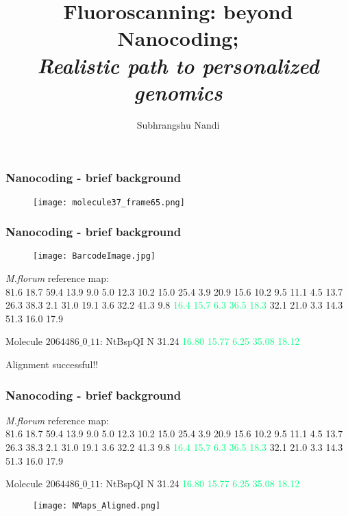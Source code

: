 \documentclass[10pt,dvipsnames,table]{beamer}
\title[Fluoroscanning: beyond nanocoding]{Fluoroscanning: beyond Nanocoding; \\ {\emph{Realistic path to personalized genomics}}}
\author{Subhrangshu Nandi}
\begin{document}
\setlength{\baselineskip}{16truept}
\frame{\maketitle}



\begin{frame}
\frametitle{Nanocoding - brief background}
\begin{figure}[T]
\texttt{[image: molecule37\_frame65.png]}
\end{figure}
\end{frame}

\begin{frame}
\frametitle{Nanocoding - brief background}
\begin{figure}[T]
\texttt{[image: BarcodeImage.jpg]}
\end{figure}

{\emph{M.florum}} reference map: \\
81.6 18.7 59.4 13.9 9.0 5.0 12.3 10.2 15.0 25.4 3.9 20.9 15.6 10.2 9.5 11.1 4.5 
13.7 26.3 38.3 2.1 31.0 19.1 3.6 32.2 41.3 9.8 \textcolor<3>{SpringGreen}{16.4 15.7 6.3 36.5 18.3} 32.1 21.0 
3.3 14.3 51.3 16.0 17.9

\pause
Molecule $2064486\_0\_11$: NtBspQI N  31.24  \textcolor<3>{SpringGreen}{16.80  15.77  6.25  35.08  18.12}

Alignment successful!!
\end{frame}

\begin{frame}
\frametitle{Nanocoding - brief background}
{\emph{M.florum}} reference map: \\
81.6 18.7 59.4 13.9 9.0 5.0 12.3 10.2 15.0 25.4 3.9 20.9 15.6 10.2 9.5 11.1 4.5 
13.7 26.3 38.3 2.1 31.0 19.1 3.6 32.2 41.3 9.8 \textcolor{SpringGreen}{16.4 15.7 6.3 36.5 18.3} 32.1 21.0 
3.3 14.3 51.3 16.0 17.9

Molecule $2064486\_0\_11$: NtBspQI N  31.24  \textcolor{SpringGreen}{16.80  15.77  6.25  35.08  18.12}

\begin{figure}[T]
\texttt{[image: NMaps\_Aligned.png]}
\end{figure}

\end{frame}
\end{document}
